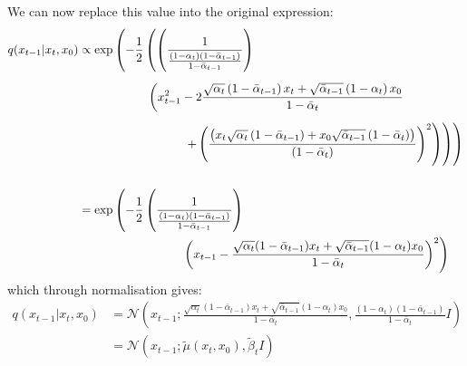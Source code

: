 \documentclass[twoside]{article}
\numberwithin{equation}{section}
\numberwithin{figure}{section}
\begin{document}
We can now replace this value into the original expression:
\begin{align}
  q(x_{t-1} | x_t, x_0) &\propto \exp \left(- \frac{1}{2} \left( \left(\frac{1}{\frac{\left(1 - \alpha_t\right)\left(1 - \bar{\alpha}_{t-1}\right)}{1 - \bar{\alpha}_{t-1}}}\right) \right. \right. \\[5pt]
  & \hspace{2cm} \left(x_{t-1}^2 -2 \frac{\sqrt{\alpha_t} \left(1 - \bar{\alpha}_{t-1}\right) x_t + \sqrt{\bar{\alpha}_{t-1}}\left(1 - \alpha_t\right) x_0}{1 - \bar{\alpha}_t} \right. \notag \\[5pt]
  & \hspace{3cm} \left. \left. \left. + \left(\frac{\left( x_t \sqrt{\alpha_t} \left( 1 - \bar{\alpha}_{t-1} \right) + x_0 \sqrt{\bar{\alpha}_{t-1}} \left( 1 - \bar{\alpha}_t \right) \right)}{\left(1 - \bar{\alpha}_{t}\right)} \right)^2 \right) \right) \right) \\[15pt]
  &= \exp \left(- \frac{1}{2} \left(\frac{1}{\frac{\left(1 - \alpha_t\right)\left(1 - \bar{\alpha}_{t-1}\right)}{1 - \bar{\alpha}_{t-1}}}\right) \right. \\
  & \hspace{3cm} \left. \left( x_{t-1} - \frac{\sqrt{\alpha_t}(1 - \bar{\alpha}_{t-1}) x_t + \sqrt{\bar{\alpha}_{t-1}}(1 - \alpha_t) x_0}{1 - \bar{\alpha}_t} \right)^2  \right) \notag
\end{align}
which through normalisation gives:
\begin{align}
  q(x_{t-1} | x_t, x_0) &= \mathcal{N} \left(x_{t-1}; \frac{\sqrt{\alpha_t}(1 - \bar{\alpha}_{t-1}) x_t + \sqrt{\bar{\alpha}_{t-1}}(1 - \alpha_t) x_0}{1 - \bar{\alpha}_t} , \frac{\left(1 - \alpha_t\right)\left(1 - \bar{\alpha}_{t-1}\right)}{1 - \bar{\alpha}_{t}} I \right) \\[15pt]
  &= \mathcal{N} \left(x_{t-1}; \tilde{\mu}(x_t, x_0), \tilde{\beta}_t I \right)
\end{align}
\end{document}
